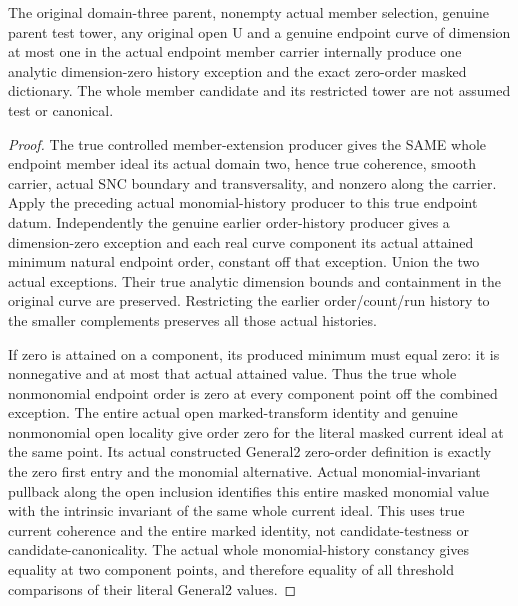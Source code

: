 \begin{theorem}
\label{hir:member-monomial-literal-masked-values}
\leanok
The original domain-three parent, nonempty actual member selection, genuine
parent test tower, any original open U and a genuine endpoint curve of
dimension at most one in the actual endpoint member carrier internally
produce one analytic dimension-zero history exception and the exact
zero-order masked dictionary. The whole member candidate and its restricted
tower are not assumed test or canonical.
\end{theorem}
\begin{proof}
The true controlled member-extension producer gives the SAME whole endpoint
member ideal its actual domain two, hence true coherence, smooth carrier,
actual SNC boundary and transversality, and nonzero along the carrier. Apply
the preceding actual monomial-history producer to this true endpoint datum.
Independently the genuine earlier order-history producer gives a dimension-zero
exception and each real curve component its actual attained minimum natural
endpoint order, constant off that exception. Union the two actual exceptions.
Their true analytic dimension bounds and containment in the original curve
are preserved. Restricting the earlier order/count/run history to the smaller
complements preserves all those actual histories.

If zero is attained on a component, its produced minimum must equal zero:
it is nonnegative and at most that actual attained value. Thus the true whole
nonmonomial endpoint order is zero at every component point off the combined
exception. The entire actual open marked-transform identity and genuine
nonmonomial open locality give order zero for the literal masked current
ideal at the same point. Its actual constructed General2 zero-order definition
is exactly the zero first entry and the monomial alternative. Actual
monomial-invariant pullback along the open inclusion identifies this entire
masked monomial value with the intrinsic invariant of the same whole current
ideal. This uses true current coherence and the entire marked identity, not
candidate-testness or candidate-canonicality. The actual whole monomial-history
constancy gives equality at two component points, and therefore equality of
all threshold comparisons of their literal General2 values.
\end{proof}

